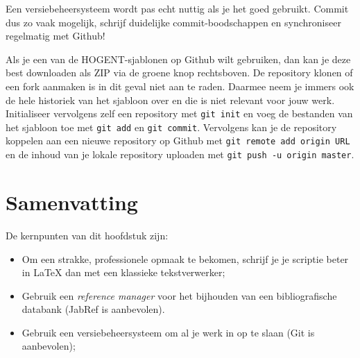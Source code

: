 Een versiebeheersysteem wordt pas echt nuttig als je het goed gebruikt. Commit dus zo vaak mogelijk, schrijf duidelijke commit-boodschappen en synchroniseer regelmatig met Github!

Als je een van de HOGENT-sjablonen op Github wilt gebruiken, dan kan je deze best downloaden als ZIP via de groene knop rechtsboven. De repository klonen of een fork aanmaken is in dit geval niet aan te raden. Daarmee neem je immers ook de hele historiek van het sjabloon over en die is niet relevant voor jouw werk. Initialiseer vervolgens zelf een repository met \texttt{git init} en voeg de bestanden van het sjabloon toe met \texttt{git add} en \texttt{git commit}. Vervolgens kan je de repository koppelen aan een nieuwe repository op Github met \texttt{git remote add origin URL} en de inhoud van je lokale repository uploaden met \texttt{git push -u origin master}.

\section{Samenvatting}%
\label{sec:voorbereiding-samenvatting}

De kernpunten van dit hoofdstuk zijn:

\begin{itemize}
  \item Om een strakke, professionele opmaak te bekomen, schrijf je je scriptie beter in {\LaTeX} dan met een klassieke tekstverwerker;
  \item Gebruik een \emph{reference manager} voor het bijhouden van een bibliografische databank (JabRef is aanbevolen).
  \item Gebruik een versiebeheersysteem om al je werk in op te slaan (Git is aanbevolen);
\end{itemize}
